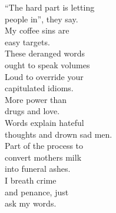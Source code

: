 ``The hard part is letting\\
people in'', they say.\\
My coffee sins are\\
easy targets.\\
These deranged words\\
ought to speak volumes\\
Loud to override your\\
capitulated idioms.\\
More power than\\
drugs and love.\\
Words explain hateful\\
thoughts and drown sad men.\\
Part of the process to\\
convert mothers milk\\
into funeral ashes.\\
I breath crime\\
and penance, just\\
ask my words.\\


